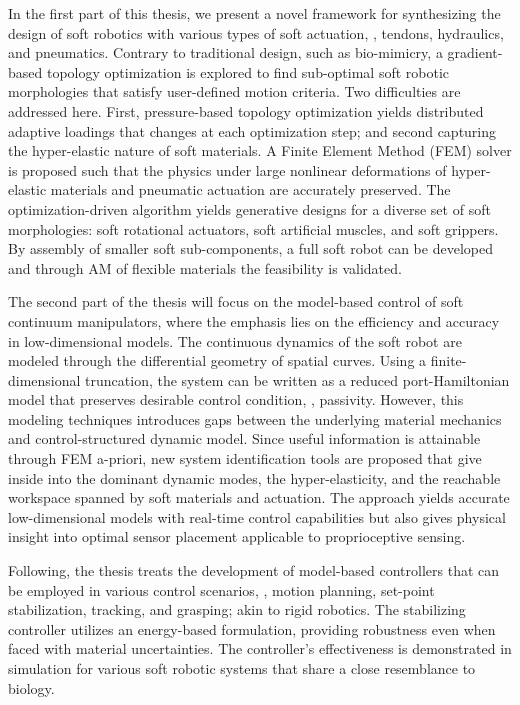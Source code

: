 \par \vspace*{2pt} In the first part of this thesis, we present a novel framework for synthesizing the design of soft robotics with various types of soft actuation, \eg, tendons, hydraulics, and pneumatics. Contrary to traditional design, such as bio-mimicry, a gradient-based topology optimization is explored to find sub-optimal soft robotic morphologies that satisfy user-defined motion criteria. Two difficulties are addressed here. First, pressure-based topology optimization yields distributed adaptive loadings that changes at each optimization step; and second capturing the hyper-elastic nature of soft materials.
A Finite Element Method (FEM) solver is proposed such that the physics under large nonlinear deformations of hyper-elastic materials and pneumatic actuation are accurately preserved. The optimization-driven algorithm yields generative designs for a diverse set of soft morphologies: soft rotational actuators, soft artificial muscles, and soft grippers. By assembly of  smaller soft sub-components, a full soft robot can be developed and through AM of flexible materials the feasibility is validated.

\par The second part of the thesis will focus on the model-based control of soft continuum manipulators, where the emphasis lies on the efficiency and accuracy in low-dimensional models. The continuous dynamics of the soft robot are modeled through the differential geometry of spatial curves. Using a finite-dimensional truncation, the system can be written as a reduced port-Hamiltonian model that preserves desirable control condition, \eg, passivity. However, this modeling techniques introduces gaps between the underlying material mechanics and control-structured dynamic model. Since useful information is attainable through FEM a-priori, new system identification tools are proposed that give inside into the dominant dynamic modes, the hyper-elasticity, and the reachable workspace spanned by soft materials and actuation. The approach yields accurate low-dimensional models with real-time control capabilities but also gives physical insight into optimal sensor placement applicable to proprioceptive sensing.

Following, the thesis treats the development of model-based controllers that can be employed in various control scenarios, \eg, motion planning, set-point stabilization, tracking, and grasping; akin to rigid robotics. The stabilizing controller utilizes an energy-based formulation, providing robustness even when faced with material uncertainties. The controller's effectiveness is demonstrated in simulation for various soft robotic systems that share a close resemblance to biology.

